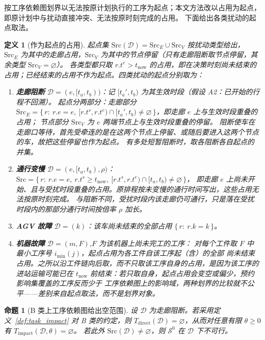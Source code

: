 \documentclass[manuscript,screen,review]{acmart}
\newtheorem{definition}{定义}
\newtheorem{prop}{命题}
\begin{document}
按工序依赖图划界以无法按原计划执行的工序为起点；本文方法改以占用为起点，即原计划中与扰动直接冲突、无法按原时刻完成的占用。
下面给出各类扰动的起点取法。

\begin{definition}[作为起点的占用]
\label{def:seeds}
起点集 \(\mathrm{Src}(\mathcal{D})=\mathrm{Src}_E\cup\mathrm{Src}_V\) 按扰动类型给出，
\(\mathrm{Src}_E\) 为其中的走廊占用，\(\mathrm{Src}_V\) 为其中的节点停留（只有走廊阻断取节点停留，其余类型 \(\mathrm{Src}_V=\varnothing\)）。
各类型都只取 \(r.t^e>t_{\mathrm{now}}\) 的占用，即在决策时刻尚未结束的占用；已经结束的占用不作为起点。四类扰动的起点分别取为：
\begin{enumerate}[label=(\alph*),leftmargin=1.6em,itemsep=0.15em]
\item \textbf{走廊阻断} \(\mathcal{D}=(e,[t_a,t_b))\)：记 \([t_a',t_b)\) 为其生效时段（假设 A2：已开始的行程不回溯）。
起点分两部分：走廊部分
\(\mathrm{Src}_E=\{\,r:\ r.e=e,\ [r.t^s,r.t^e)\cap[t_a',t_b)\neq\varnothing\,\}\)，即走廊 \(e\) 上与生效时段重叠的占用；
节点部分 \(\mathrm{Src}_V\) 为 \(e\) 两端节点上与生效时段重叠的停留。
阻断使车在走廊口等待，首先受牵连的是在这两个节点上停留、或随后要进入这两个节点的车，故把这些停留也作为起点。
有多处短暂阻断时，取各阻断各自起点的并集。
\item \textbf{通行变慢} \(\mathcal{D}=(e,[t_a,t_b),\rho)\)：
\(\mathrm{Src}=\{\,r:\ r.e=e,\ r.t^s\ge t_{\mathrm{now}},\ [r.t^s,r.t^e)\cap[t_a,t_b)\neq\varnothing\,\}\)，
即走廊 \(e\) 上尚未开始、且与受扰时段重叠的占用。原排程按未变慢的通行时间写出，这些占用无法按原时刻完成。
与阻断不同，受扰时段内该走廊仍可通行，只是落在受扰时段内的那部分通行时间按倍率 \(\rho\) 加长。
\item \textbf{AGV 故障} \(\mathcal{D}=(k)\)：该车尚未结束的全部占用
\(\{\,r:\ r.k=k\,\}\)。
\item \textbf{机器故障} \(\mathcal{D}=(m,F)\),\(F\) 为该机器上尚未完工的工序：
对每个工件取 \(F\) 中最小工序号 \(i_{\min}(j)\)，起点占用为各工件自该工序起（含）的全部
尚未结束占用。之所以沿工件链向后取，而不只取该工序自身的占用，是因为该工序的进站运输可能已在
\(t_{\mathrm{now}}\) 前结束：若只取自身，起点占用会变空或偏少，预约影响集覆盖的工序反而少于
工序依赖图上的影响域，两种划界的比较就不公平——差别来自起点取法，而不是划界对象。
\end{enumerate}
\end{definition}

\begin{prop}[B 类上工序依赖图给出空范围]
\label{prop:miss}
设 \(\mathcal{D}\) 为走廊阻断。若采用定义~\ref{def:task_impact} 对 B 类的约定，则
\(T_{\mathrm{direct}}(\mathcal{D})=\varnothing\)，从而对任意有限 \(\theta\ge 0\) 有
\(T_{\mathrm{impact}}(\mathcal{D},\theta)=\varnothing\)。
若此外 \(\mathrm{Src}(\mathcal{D})\neq\varnothing\)，则 \(\mathcal{S}^0\) 在 \(\mathcal{D}\) 下不可行。
\end{prop}
\end{document}
